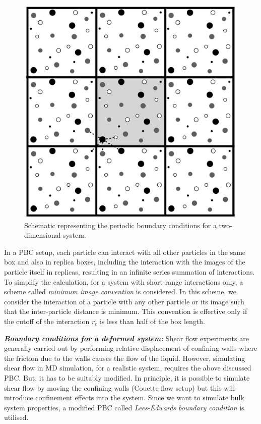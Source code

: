     \begin{figure}[hbt!]
	\includegraphics[width=12cm]{figs/pbc.pdf}
	\centering
	\caption[{\em Schematic representing the periodic boundary conditions}]{Schematic representing the periodic boundary conditions for a two-dimensional system.\label{pbc}}
    \end{figure}
    
    In a PBC setup, each particle can interact with all other particles in the same box and also in replica boxes, including the interaction with the images of the particle itself in replicas, resulting in an infinite series summation of interactions. To simplify the calculation, for a system with short-range interactions only, a scheme called {\em minimum image convention} is considered. In this scheme, we consider the interaction of a particle with any other particle or its image such that the inter-particle distance is minimum. This convention is effective only if the cutoff of the interaction $r_c$ is less than half of the box length.
    
    {\bf \em Boundary conditions for a deformed system:} Shear flow experiments are generally carried out by performing relative displacement of confining walls where the friction due to the walls causes the flow of the liquid. However, simulating shear flow in MD simulation, for a realistic system, requires the above discussed PBC. But, it has to be suitably modified. In principle, it is possible to simulate shear flow by moving the confining walls (Couette flow setup) but this will introduce confinement effects into the system. Since we want to simulate bulk system properties, a modified PBC called {\em Lees-Edwards boundary condition} \cite{allen2017} is utilised. 
    
